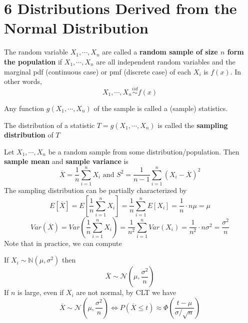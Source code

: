 \documentclass[11pt]{article}
\begin{document}
\section*{6 Distributions Derived from the Normal Distribution}

\begin{defn*}
  The random variable $X_1, \cdots, X_n$ are called a \textbf{random sample of size $n$ form the population} if $X_1, \cdots, X_n$ are all independent random variables and the marginal pdf (continuous case) or pmf (discrete case) of each $X_i$ is $f(x)$. In other words,
  \[
    X_1, \cdots, X_n \stackrel{iid}{\sim} f(x)
  \]
\end{defn*}


\begin{defn*}
  Any function $g(X_1, \cdots, X_n)$ of the sample is called a (sample) statistics.
\end{defn*}

\begin{defn*}
  The distribution of a statistic $T=g(X_1, \cdots, X_n)$ is called the \textbf{sampling distribution} of $T$
\end{defn*}

\begin{defn*}
  Let $X_1, \cdots, X_n$ be a random sample from some distribution/population. Then \textbf{sample mean} and \textbf{sample variance} is
  \[
    \overline{X} = \frac{1}{n}\sum_{i=1}^{n}X_i \text{  and  } S^2 = \frac{1}{n-1} \sum_{i=1}^n (X_i - \overline{X})^2
  \]
  The sampling distribution can be partially characterized by
  \[
    E[\overline{X}] = E[\frac{1}{n}\sum_{i=1}^n X_i] = \frac{1}{n}\sum_{i=1}^n E[X_i] = \frac{1}{n} \cdot n\mu =\mu
  \]
  \[
    Var(\overline{X}) = Var(\frac{1}{n}\sum_{i=1}^n X_i) = \frac{1}{n^2}\sum_{i=1}^n Var(X_i) = \frac{1}{n^2} \cdot n\sigma^2 = \frac{\sigma^2}{n}
  \]
  Note that in practice, we can compute
  \begin{rem}
    If $X_i \sim \mathbb{N} (\mu, \sigma^2)$ then
    \[
      \overline{X}\sim \mathcal{N} \left( \mu, \frac{\sigma^2}{n} \right)
    \]
    If $n$ is large, even if $X_i$ are not normal, by CLT we have
    \[
      \overline{X}\sim \mathcal{N}(\mu, \frac{\sigma^2}{n}) \iff P(\overline{X}\leq t) \approx \Phi (\frac{t-\mu}{\sigma / \sqrt{n}} )
    \]
  \end{rem}
\end{defn*}
\end{document}
